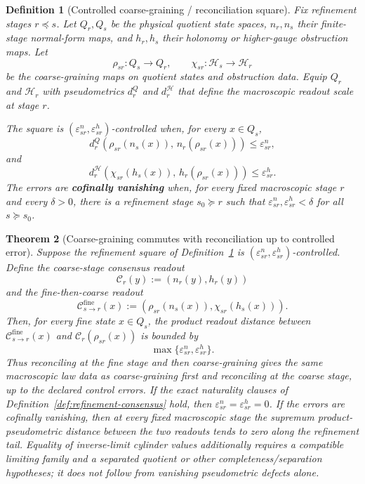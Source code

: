 \documentclass[11pt]{article}
\newtheorem{theorem}{Theorem}[section]
\newtheorem{definition}[theorem]{Definition}
\theoremstyle{remark}
\theoremstyle{plain}
\begin{document}
\begin{definition}[Controlled coarse-graining / reconciliation square]\label{def:controlled-coarse-consensus}
Fix refinement stages \(r\preceq s\). Let \(Q_r,Q_s\) be the physical quotient state spaces,
\(n_r,n_s\) their finite-stage normal-form maps, and \(h_r,h_s\) their holonomy or
higher-gauge obstruction maps. Let
\[
\rho_{sr}:Q_s\to Q_r,
\qquad
\chi_{sr}:\mathcal H_s\to\mathcal H_r
\]
be the coarse-graining maps on quotient states and obstruction data. Equip \(Q_r\) and
\(\mathcal H_r\) with pseudometrics \(d^Q_r\) and \(d^{\mathcal H}_r\) that define the
macroscopic readout scale at stage \(r\).

The square is \((\varepsilon^n_{sr},\varepsilon^h_{sr})\)-controlled when, for every
\(x\in Q_s\),
\[
d^Q_r\!\left(\rho_{sr}(n_s(x)),\,n_r(\rho_{sr}(x))\right)
\le \varepsilon^n_{sr},
\]
and
\[
d^{\mathcal H}_r\!\left(\chi_{sr}(h_s(x)),\,h_r(\rho_{sr}(x))\right)
\le \varepsilon^h_{sr}.
\]
The errors are \textbf{cofinally vanishing} when, for every fixed macroscopic stage \(r\) and
every \(\delta>0\), there is a refinement stage \(s_0\succeq r\) such that
\(\varepsilon^n_{sr},\varepsilon^h_{sr}<\delta\) for all \(s\succeq s_0\).
\end{definition}

\begin{theorem}[Coarse-graining commutes with reconciliation up to controlled error]\label{thm:coarse-grain-consensus}
Suppose the refinement square of Definition~\ref{def:controlled-coarse-consensus} is
\((\varepsilon^n_{sr},\varepsilon^h_{sr})\)-controlled. Define the coarse-stage consensus readout
\[
\mathcal C_r(y):=(n_r(y),h_r(y))
\]
and the fine-then-coarse readout
\[
\mathcal C_{s\to r}^{\mathrm{fine}}(x):=(\rho_{sr}(n_s(x)),\chi_{sr}(h_s(x))).
\]
Then, for every fine state \(x\in Q_s\), the product readout distance between
\(\mathcal C_{s\to r}^{\mathrm{fine}}(x)\) and \(\mathcal C_r(\rho_{sr}(x))\) is bounded by
\[
\max\{\varepsilon^n_{sr},\varepsilon^h_{sr}\}.
\]
Thus reconciling at the fine stage and then coarse-graining gives the same macroscopic law data
as coarse-graining first and reconciling at the coarse stage, up to the declared control errors.
If the exact naturality clauses of Definition~\ref{def:refinement-consensus} hold, then
\(\varepsilon^n_{sr}=\varepsilon^h_{sr}=0\). If the errors are cofinally vanishing, then at every
fixed macroscopic stage the supremum product-pseudometric distance between the two readouts tends
to zero along the refinement tail. Equality of inverse-limit cylinder values additionally requires
a compatible limiting family and a separated quotient or other completeness/separation hypotheses;
it does not follow from vanishing pseudometric defects alone.
\end{theorem}
\end{document}

